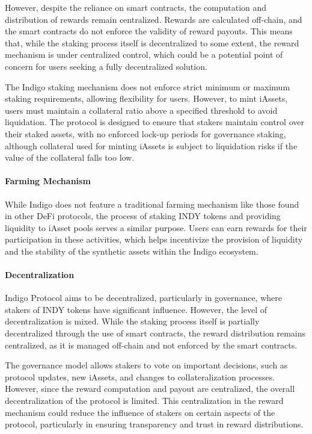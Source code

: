 \documentclass[12pt,parskip=full, tikz]{article}
\begin{document}
However, despite the reliance on smart contracts, the computation and distribution of rewards remain centralized. Rewards are calculated off-chain, and the smart contracts do not enforce the validity of reward payouts. This means that, while the staking process itself is decentralized to some extent, the reward mechanism is under centralized control, which could be a potential point of concern for users seeking a fully decentralized solution.

The Indigo staking mechanism does not enforce strict minimum or maximum staking requirements, allowing flexibility for users. However, to mint iAssets, users must maintain a collateral ratio above a specified threshold to avoid liquidation. The protocol is designed to ensure that stakers maintain control over their staked assets, with no enforced lock-up periods for governance staking, although collateral used for minting iAssets is subject to liquidation risks if the value of the collateral falls too low.

\paragraph{Farming Mechanism}

While Indigo does not feature a traditional farming mechanism like those found in other DeFi protocols, the process of staking INDY tokens and providing liquidity to iAsset pools serves a similar purpose. Users can earn rewards for their participation in these activities, which helps incentivize the provision of liquidity and the stability of the synthetic assets within the Indigo ecosystem.

\paragraph{Decentralization}

Indigo Protocol aims to be decentralized, particularly in governance, where stakers of INDY tokens have significant influence. However, the level of decentralization is mixed. While the staking process itself is partially decentralized through the use of smart contracts, the reward distribution remains centralized, as it is managed off-chain and not enforced by the smart contracts.

The governance model allows stakers to vote on important decisions, such as protocol updates, new iAssets, and changes to collateralization processes. However, since the reward computation and payout are centralized, the overall decentralization of the protocol is limited. This centralization in the reward mechanism could reduce the influence of stakers on certain aspects of the protocol, particularly in ensuring transparency and trust in reward distributions.
\end{document}
